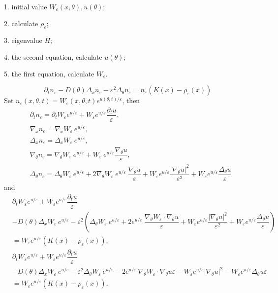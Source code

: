 \documentclass[preprint]{article}
\numberwithin{equation}{section}
\begin{document}
1. initial value $W_\varepsilon(x,\theta), u(\theta)$;

2. calculate $\rho_\varepsilon$;

3. eigenvalue $H$;

4. the second equation, calculate $u(\theta)$;

5. the first equation, calculate $W_\varepsilon$.

\newpage

$$
    \partial_t n_\varepsilon -D(\theta)\Delta_x n_\varepsilon -\varepsilon^2\Delta_\theta n_\varepsilon = n_\varepsilon(K(x)-\rho_\varepsilon(x))
$$
Set $n_\varepsilon(x,\theta, t) = W_\varepsilon(x,\theta, t) e^{u(\theta, t)/\varepsilon}$, then
\begin{equation}
\begin{aligned}
&\partial_t n_\varepsilon = \partial_t W_\varepsilon e^{u/\varepsilon} + W_\varepsilon e^{u/\varepsilon}\dfrac{\partial_t u}{\varepsilon},\\
&\nabla_x n_\varepsilon = \nabla_x W_\varepsilon ~e^{u/\varepsilon},\\
&\Delta_x n_\varepsilon = \Delta_x W_\varepsilon ~e^{u/\varepsilon},\\
&\nabla_\theta n_\varepsilon = \nabla_\theta W_\varepsilon ~e^{u/\varepsilon} + W_\varepsilon ~e^{u/\varepsilon} \dfrac{\nabla_\theta u}{\varepsilon},\\
&\Delta_\theta n_\varepsilon = \Delta_\theta W_\varepsilon ~e^{u/\varepsilon} + 2\nabla_\theta W_\varepsilon~e^{u/\varepsilon}~\dfrac{\nabla_\theta u}{\varepsilon} + W_\varepsilon e^{u/\varepsilon}\dfrac{|\nabla_\theta u|^2}{\varepsilon^2} + W_\varepsilon e^{u/\varepsilon}\dfrac{\Delta_\theta u}{\varepsilon}
\end{aligned}
\end{equation}
and
\begin{equation}
\begin{aligned}
&\partial_t W_\varepsilon e^{u/\varepsilon} + W_\varepsilon e^{u/\varepsilon}\dfrac{\partial_t u}{\varepsilon}\\
&-D(\theta)\Delta_x W_\varepsilon ~e^{u/\varepsilon} -\varepsilon^2\left(\Delta_\theta W_\varepsilon ~e^{u/\varepsilon} + 2e^{u/\varepsilon}~\dfrac{\nabla_\theta W_\varepsilon\cdot \nabla_\theta u}{\varepsilon} + W_\varepsilon e^{u/\varepsilon}\dfrac{|\nabla_\theta u|^2}{\varepsilon^2} + W_\varepsilon e^{u/\varepsilon}\dfrac{\Delta_\theta u}{\varepsilon}\right)\\
&= W_\varepsilon e^{u/\varepsilon}(K(x)-\rho_\varepsilon(x)),\\
&\partial_t W_\varepsilon e^{u/\varepsilon} + W_\varepsilon e^{u/\varepsilon}\dfrac{\partial_t u}{\varepsilon}\\
&-D(\theta)\Delta_x W_\varepsilon ~e^{u/\varepsilon} -\varepsilon^2\Delta_\theta W_\varepsilon ~e^{u/\varepsilon} - 2e^{u/\varepsilon}~\nabla_\theta W_\varepsilon\cdot \nabla_\theta u\varepsilon - W_\varepsilon e^{u/\varepsilon}|\nabla_\theta u|^2 - W_\varepsilon e^{u/\varepsilon}\Delta_\theta u\varepsilon\\
&= W_\varepsilon e^{u/\varepsilon}(K(x)-\rho_\varepsilon(x)),\\
\end{aligned}
\end{equation}
\end{document}
